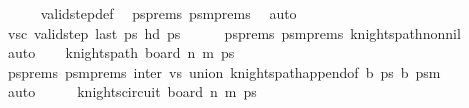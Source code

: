 \begin{isabellebody}
\ \ \ \ \isamarkupfalse%
\ valid{\isacharunderscore}{\kern0pt}step{\isacharunderscore}{\kern0pt}def\ \isamarkupfalse%
\ psprems\ psm{}{\isacharunderscore}{\kern0pt}prems\ \isamarkupfalse%
\ auto\isanewline
\ \ \isamarkupfalse%
\ \isamarkupfalse%
\ vs{\isacharunderscore}{\kern0pt}c{\isacharcolon}{\kern0pt}\ {\isachardoublequoteopen}valid{\isacharunderscore}{\kern0pt}step\ {\isacharparenleft}{\kern0pt}last\ {\isacharquery}{\kern0pt}ps{\isacharparenright}{\kern0pt}\ {\isacharparenleft}{\kern0pt}hd\ {\isacharquery}{\kern0pt}ps{\isacharparenright}{\kern0pt}{\isachardoublequoteclose}\isanewline
\ \ \ \ \isamarkupfalse%
\ psprems\ psm{}{\isacharunderscore}{\kern0pt}prems\ knights{\isacharunderscore}{\kern0pt}path{\isacharunderscore}{\kern0pt}non{\isacharunderscore}{\kern0pt}nil\ \isamarkupfalse%
\ auto\isanewline
\isanewline
\ \ \isamarkupfalse%
\ {\isachardoublequoteopen}knights{\isacharunderscore}{\kern0pt}path\ {\isacharparenleft}{\kern0pt}board\ n\ m{\isacharparenright}{\kern0pt}\ {\isacharquery}{\kern0pt}ps{\isachardoublequoteclose}\isanewline
\ \ \ \ \isamarkupfalse%
\ psprems\ psm{}{\isacharunderscore}{\kern0pt}prems\ inter\ vs\ union\ knights{\isacharunderscore}{\kern0pt}path{\isacharunderscore}{\kern0pt}append{\isacharbrackleft}{\kern0pt}of\ {\isacharquery}{\kern0pt}b\ {\isacharquery}{\kern0pt}ps\ {\isacharquery}{\kern0pt}b\ {\isacharquery}{\kern0pt}psm{}{\isacharbrackright}{\kern0pt}\ \isanewline
\ \ \ \ \isamarkupfalse%
\ auto\isanewline
\ \ \isamarkupfalse%
\ \isamarkupfalse%
\ {\isachardoublequoteopen}knights{\isacharunderscore}{\kern0pt}circuit\ {\isacharparenleft}{\kern0pt}board\ n\ m{\isacharparenright}{\kern0pt}\ {\isacharquery}{\kern0pt}ps{\isachardoublequoteclose}\isanewline
\ \ \ \ \isamarkupfalse%

\end{isabellebody}
